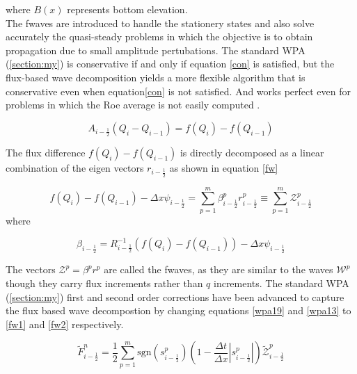 \documentclass[12pt,a4paper]{article}
\begin{document}
	\noindent where $B(x)$ represents bottom elevation. \\
	
	\noindent The fwaves are introduced to handle the stationery states and also solve accurately  the quasi-steady problems in which the objective is to obtain propagation due to small amplitude pertubations. The standard WPA (\ref{section:my}) is conservative if and only if equation \eqref{con} is satisfied, but the flux-based wave decomposition yields a more flexible algorithm that is conservative even when equation\eqref{con} is not satisfied. And works perfect even for problems in which the Roe average is not easily computed \cite{ba-le-mi-ro:2003}.
	
	\begin{equation}
		A_{i-\frac{1}{2}} (Q_{i} - Q_{i-1}) = f(Q_i) - f(Q_{i-1})
		\label{con}
	\end{equation}
	
	\noindent The flux difference $ f(Q_i) - f(Q_{i-1})$ is directly decomposed as  a linear combination of the eigen vectors $r_{i-\frac{1}{2}}$ as shown in equation \eqref{fw}
	
	\begin{equation}
	f(Q_{i}) - f(Q_{i-1})  - \Delta x \psi_{i-\frac{1}{2}} = \sum_{p=1}^{m} \beta_{i-\frac{1}{2}} ^{p} r_{i-\frac{1}{2}}^{p}  \equiv \sum_{p=1}^{m} \mathcal{Z}_{i-\frac{1}{2}}^{p} 
	\label{fw}
	\end{equation}
	where
	
	\begin{equation}
		\beta_{i-\frac{1}{2}} = R_{i-\frac{1}{2}}^{-1} (f(Q_{i}) - f(Q_{i-1}))  - \Delta x \psi_{i-\frac{1}{2}}
		\label{fw1}
	\end{equation}
	
	\noindent The vectors $\mathcal{Z}^{p} = \beta^{p} r^p$ are called the fwaves, as they are similar to the waves $\mathcal{W}^p$ though they carry flux increments rather than $q$ increments. The standard WPA (\ref{section:my}) first and second order corrections have been advanced to capture the flux based wave decompostion by changing equations \eqref{wpa19} and  \eqref{wpa13}  to  \eqref{fw1} and \eqref{fw2} respectively.
	
		\begin{equation}
		\tilde{F}_{i-\frac{1}{2}}^{n} = \frac{1}{2} \sum_{p=1}^{m}  \text{sgn}(s_{i- \frac{1}{2}}^{p}) \left( 1 - \frac{\Delta t}{\Delta x} |s_{i- \frac{1}{2}}^{p}|\right) \tilde{\mathcal{Z}}_{i-\frac{1}{2}}^{p} 
		\label{fw2}
	\end{equation}
	
\end{document}
